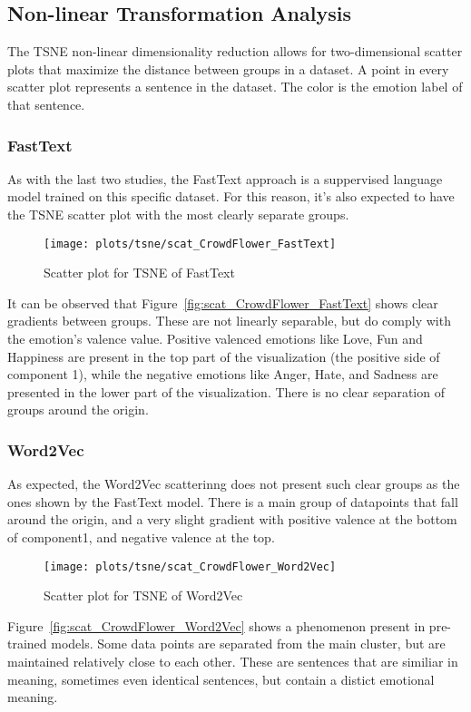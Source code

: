 \subsection{Non-linear Transformation Analysis}\label{sub:Non-linear Transformation Analysis}
The TSNE non-linear dimensionality reduction allows for two-dimensional scatter plots that maximize the distance between groups in a dataset. A point in every scatter plot represents a sentence in the dataset. The color is the emotion label of that sentence.
\subsubsection{FastText}
As with the last two studies, the FastText approach is a suppervised language model trained on this specific dataset. For this reason, it's also expected to have the TSNE scatter plot with the most clearly separate groups.
\begin{figure}[H]
  \texttt{[image: plots/tsne/scat\_CrowdFlower\_FastText]}
  \centering
  \caption{Scatter plot for TSNE of FastText}
\end{figure}\label{fig:scat_CrowdFlower_FastText}
It can be observed that Figure~\ref{fig:scat_CrowdFlower_FastText} shows clear gradients between groups. These are not linearly separable, but do comply with the emotion's valence value. Positive valenced emotions like Love, Fun and Happiness are present in the top part of the visualization (the positive side of component 1), while the negative emotions like Anger, Hate, and Sadness are presented in the lower part of the visualization. There is no clear separation of groups around the origin.
\subsubsection{Word2Vec}
As expected, the Word2Vec scatterinng does not present such clear groups as the ones shown by the FastText model. There is a main group of datapoints that fall around the origin, and a very slight gradient with positive valence at the bottom of component1, and negative valence at the top.
\begin{figure}[H]
  \texttt{[image: plots/tsne/scat\_CrowdFlower\_Word2Vec]}
  \centering
  \caption{Scatter plot for TSNE of Word2Vec}
\end{figure}\label{fig:scat_CrowdFlower_Word2Vec}
Figure~\ref{fig:scat_CrowdFlower_Word2Vec} shows a phenomenon present in pre-trained models. Some data points are separated from the main cluster, but are maintained relatively close to each other. These are sentences that are similiar in meaning, sometimes even identical sentences, but contain a distict emotional meaning.
